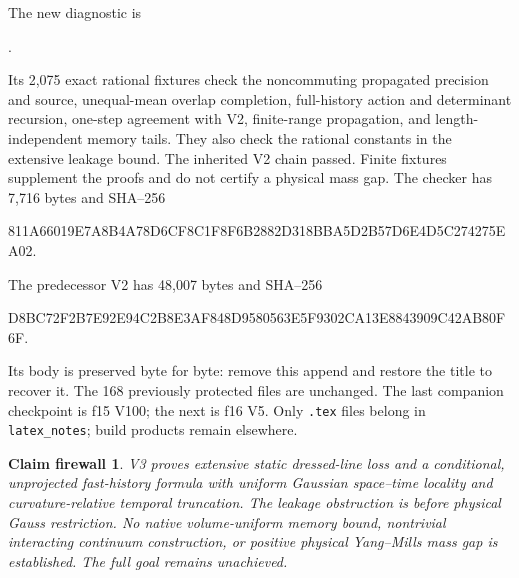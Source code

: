 \documentclass[11pt,oneside]{article}
\newtheorem{firewall}[theorem]{Claim firewall}
\begin{document}
The new diagnostic is
\begin{center}\small
{}.
\end{center}
Its 2,075 exact rational fixtures check the noncommuting
propagated precision and source, unequal-mean overlap
completion, full-history action and determinant recursion,
one-step agreement with V2, finite-range propagation, and
length-independent memory tails. They also check the rational
constants in the extensive leakage bound. The inherited V2
chain passed. Finite fixtures supplement the proofs and do
not certify a physical mass gap.
The checker has 7,716 bytes and SHA--256
\begin{center}\scriptsize\ttfamily
811A66019E7A8B4A78D6CF8C1F8F6B2882D318BBA5D2B57D6E4D5C274275EA02.
\end{center}

The predecessor V2 has 48,007 bytes and SHA--256
\begin{center}\scriptsize\ttfamily
D8BC72F2B7E92E94C2B8E3AF848D9580563E5F9302CA13E8843909C42AB80F6F.
\end{center}
Its body is preserved byte for byte: remove this append and
restore the title to recover it. The 168 previously protected
files are unchanged. The last companion checkpoint is f15 V100;
the next is f16 V5. Only \texttt{.tex} files belong in
\texttt{latex\_notes}; build products remain elsewhere.

\begin{firewall}
V3 proves extensive static dressed-line loss and a conditional,
unprojected fast-history formula with uniform Gaussian
space--time locality and curvature-relative temporal truncation.
The leakage obstruction is before physical Gauss restriction.
No native volume-uniform memory bound, nontrivial interacting
continuum construction, or positive physical Yang--Mills
mass gap is established. The full goal remains unachieved.
\end{firewall}
\end{document}
